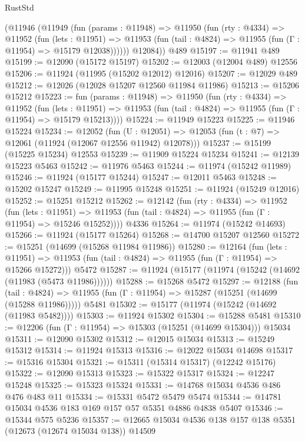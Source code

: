 \begin{lexlean}{RustStd}
\begin{coremodule}
{\begin{coremodule}
{{{{{{{{{{{{{{{{{{{{{{{{{{{{{{{{{{{{{{{{{{{{{{{{{{{{{{{{{{{{{{{{{{{{{{{{{{{{{{{{      (@11946
        (@11949
          (fun (params : @11948) =>
          @11950
            (fun (rty : @4334) =>
            @11952
              (fun (lets : @11951) =>
              @11953 (fun (tail : @4824) => @11955 (fun (Γ : @11954) => @15179 @12038))))))
        @12084))
    @489
@15197 := @11941 @489
@15199 := @12090 (@15172 @15197)
@15202 := @12003 (@12004 @489) @12556
@15206 := @11924 (@11995 (@15202 @12012) @12016)
@15207 := @12029 @489
@15212 := @12026 (@12028 @15207 @12560 @11984 @11986)
@15213 := @15206 @15212
@15223 := fun (params : @11948) =>
  @11950
    (fun (rty : @4334) =>
    @11952
      (fun (lets : @11951) =>
      @11953 (fun (tail : @4824) => @11955 (fun (Γ : @11954) => @15179 @15213))))
@15224 := @11949 @15223
@15225 := @11946 @15224
@15234 := @12052
    (fun (U : @12051) => @12053 (fun (t : @7) => @12061 (@11924 (@12067 @12556 @11942) @12078)))
@15237 := @15199 (@15225 @15234) @12553
@15239 := @11909 @15224 @15234
@15241 := @12139 @15223 @5463
@15242 := @11976 @5463
@15244 := @11974 (@15242 @11989)
@15246 := @11924 (@15177 @15244)
@15247 := @12011 @5463
@15248 := @15202 @15247
@15249 := @11995 @15248
@15251 := @11924 (@15249 @12016)
@15252 := @15251 @15212
@15262 := @12142
    (fun (rty : @4334) =>
    @11952
      (fun (lets : @11951) =>
      @11953 (fun (tail : @4824) => @11955 (fun (Γ : @11954) => @15246 @15252))))
    @4336
@15264 := @11974 (@15242 @14693)
@15266 := @11924 (@15177 @15264)
@15268 := @14700 @15207 @12560
@15272 := @15251 (@14699 (@15268 @11984 @11986))
@15280 := @12164
    (fun (lets : @11951) =>
    @11953 (fun (tail : @4824) => @11955 (fun (Γ : @11954) => @15266 @15272)))
    @5472
@15287 := @11924 (@15177 (@11974 (@15242 (@14692 (@11983 (@5473 @11986))))))
@15288 := @15268 @5472
@15297 := @12188
    (fun (tail : @4824) => @11955 (fun (Γ : @11954) => @15287 (@15251 (@14699 (@15288 @11986)))))
    @5481
@15302 := @15177 (@11974 (@15242 (@14692 (@11983 @5482))))
@15303 := @11924 @15302
@15304 := @15288 @5481
@15310 := @12206 (fun (Γ : @11954) => @15303 (@15251 (@14699 @15304))) @15034
@15311 := @12090 @15302
@15312 := @12015 @15034
@15313 := @15249 @15312
@15314 := @11924 @15313
@15316 := @12022 @15034 @14698
@15317 := @15316 @15304
@15321 := @15311 (@15314 @15317) (@12242 @15176)
@15322 := @12090 @15313
@15323 := @15322 @15317
@15324 := @12247 @15248
@15325 := @15323 @15324
@15331 := @14768 @15034 @4536 @486 @476 @483 @11
@15334 := @15331 @5472 @5479 @5474
@15344 := @14781 @15034 @4536 @183 @169 @157 @57 @5351 @4886 @4838 @5407
@15346 := @15344 @575 @5236
@15357 := @12665 @15034 @4536 @138 @157 @138 @5351 (@12673 (@12674 @15034 @138)) @14509
}}}}}}}}}}}}}}}}}}}}}}}}}}}}}}}}}}}}}}}}}}}}}}}}}}}}}}}}}}}}}}}}}}}}}}}}}}}}}}}}
\end{coremodule}}
\end{coremodule}
\end{lexlean}
